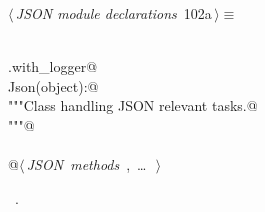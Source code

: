\documentclass[
    a4paper,      %
    10pt,         %
    openright,    %
    notitlepage,  %
    parskip=half, %
]{scrreprt}       %
\theoremstyle{definition}                    %
\begin{document}
\begin{flushleft} \small
\begin{minipage}{\linewidth}\label{scrap165}\raggedright\small
{} $\langle\,${\itshape JSON module declarations}\nobreak\ {\footnotesize {102a}}$\,\rangle\equiv$
\vspace{-1exm}
\begin{list}{}{} \item
\mbox{}\lstinline@@\\
\mbox{}\lstinline@common.with_logger@\\
\mbox{}\lstinline@class Json(object):@\\
\mbox{}\lstinline@    """Class handling JSON relevant tasks.@\\
\mbox{}\lstinline@    """@\\
\mbox{}\lstinline@@\\
\mbox{}\lstinline@    @\hbox{$\langle\,${\itshape JSON methods}\nobreak\ {\footnotesize {}, \ldots\ }$\,\rangle$}\lstinline@@\\
\mbox{}\lstinline@@{\NWsep}
\end{list}
\vspace{-1.5ex}
\footnotesize
\begin{list}{}{\setlength{\itemsep}{-\parsep}\setlength{\itemindent}{-\leftmargin}}
\item \NWtxtMacroRefIn\ .

\item{}
\end{list}
\end{minipage}\vspace{4ex}
\end{flushleft}
\end{document}
